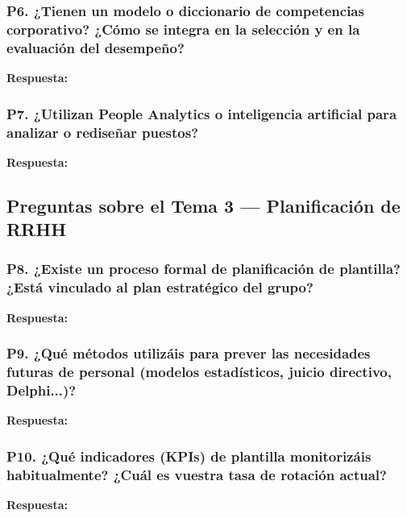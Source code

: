 \subsubsection*{P6. ¿Tienen un modelo o diccionario de competencias corporativo?
¿Cómo se integra en la selección y en la evaluación del desempeño?}

\textbf{Respuesta:}\newline
[...]

\subsubsection*{P7. ¿Utilizan People Analytics o inteligencia artificial
para analizar o rediseñar puestos?}

\textbf{Respuesta:}\newline
[...]

\subsection{Preguntas sobre el Tema 3 — Planificación de RRHH}

\subsubsection*{P8. ¿Existe un proceso formal de planificación de plantilla?
¿Está vinculado al plan estratégico del grupo?}

\textbf{Respuesta:}\newline
[...]

\subsubsection*{P9. ¿Qué métodos utilizáis para prever las necesidades futuras
de personal (modelos estadísticos, juicio directivo, Delphi...)?}

\textbf{Respuesta:}\newline
[...]

\subsubsection*{P10. ¿Qué indicadores (KPIs) de plantilla monitorizáis
habitualmente? ¿Cuál es vuestra tasa de rotación actual?}

\textbf{Respuesta:}\newline
[...]

